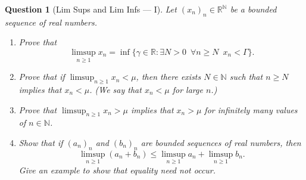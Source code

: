 \documentclass[notoc,notitlepage]{tufte-book}
\newtheorem{assgprob}{Question}[section]
\begin{document}
\begin{assgprob}[Lim Sups and Lim Infs --- I]
  Let $(x_n)_n \in \mathbb{R}^{\mathbb{N}}$ be a bounded sequence
  of real numbers.
  \begin{enumerate}
    \item Prove that
      \begin{equation*}
        \limsup_{n \geq 1} x_n
        = \inf \{ \gamma \in \mathbb{R} : \exists N > 0 \enspace
        \forall n \geq N\enspace x_n < \Gamma \}.
      \end{equation*}

    \item Prove that if $\limsup_{n \geq 1} x_n < \mu$,
      then there exists $N \in \mathbb{N}$ such that
      $n \geq N$ implies that $x_n < \mu$.
      (We say that $x_n < \mu$ for large $n$.)

    \item Prove that $\limsup_{n \geq 1} x_n > \mu$
      implies that $x_n > \mu$ for infinitely many values of $n \in \mathbb{N}$.

    \item Show that if $(a_n)_n$ and $(b_n)_n$ are bounded sequences
      of real numbers, then
      \begin{equation*}
        \limsup_{n \geq 1} (a_n + b_n)
        \leq \limsup_{n \geq 1} a_n + \limsup_{n \geq 1} b_n.
      \end{equation*}
      Give an example to show that equality need not occur.
  \end{enumerate}
\end{assgprob}
\end{document}
